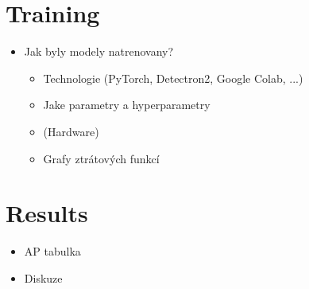 \section{Training}
\begin{itemize}
	\item Jak byly modely natrenovany?
	\begin{itemize}
	    \item Technologie (PyTorch, Detectron2, Google Colab, ...)
	    \item Jake parametry a hyperparametry
    	\item (Hardware)
	    \item Grafy ztrátových funkcí
	\end{itemize}
\end{itemize}
\section{Results}
	\begin{itemize}
	    \item AP tabulka
	    \item Diskuze
	\end{itemize}

